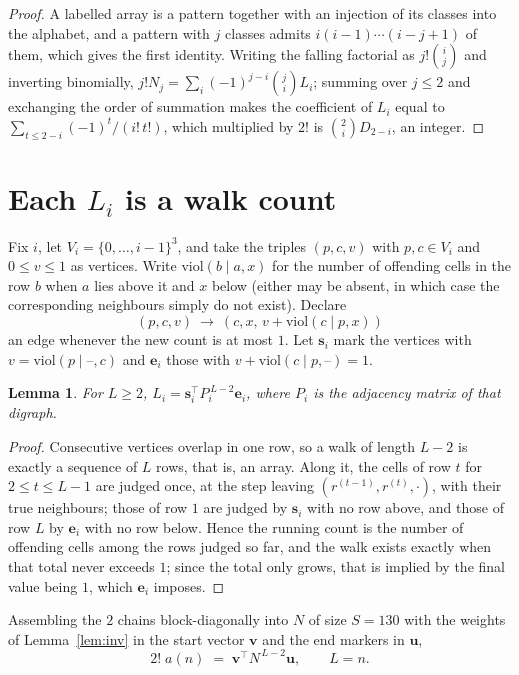 \documentclass[11pt,a4paper]{article}
\theoremstyle{plain}
\newtheorem{lemma}[theorem]{Lemma}
\theoremstyle{definition}
\begin{document}
\begin{proof}
A labelled array is a pattern together with an injection of its classes into the alphabet,
and a pattern with $j$ classes admits $i(i-1)\cdots(i-j+1)$ of them, which gives the first
identity. Writing the falling factorial as $j!\binom{i}{j}$ and inverting binomially,
$j!N_j=\sum_i(-1)^{j-i}\binom{j}{i}L_i$; summing over $j\le2$ and exchanging the
order of summation makes the coefficient of $L_i$ equal to
$\sum_{t\le2-i}(-1)^t/(i!\,t!)$, which multiplied by $2!$ is
$\binom{2}{i}D_{2-i}$, an integer.
\end{proof}

\section{Each $L_i$ is a walk count}

Fix $i$, let $V_i=\{0,\dots,i-1\}^{3}$, and take the triples $(p,c,v)$ with
$p,c\in V_i$ and $0\le v\le1$ as vertices. Write $\mathrm{viol}(b\mid a,x)$ for the number
of offending cells in the row $b$ when $a$ lies above it and $x$ below (either may be
absent, in which case the corresponding neighbours simply do not exist). Declare
\[
(p,c,v)\ \longrightarrow\ (c,x,\,v+\mathrm{viol}(c\mid p,x))
\]
an edge whenever the new count is at most $1$. Let $\mathbf{s}_i$ mark the vertices with
$v=\mathrm{viol}(p\mid\text{--},c)$ and $\mathbf{e}_i$ those with
$v+\mathrm{viol}(c\mid p,\text{--})=1$.

\begin{lemma}\label{lem:walk}
For $L\ge2$, $L_i=\mathbf{s}_i^{\!\top}P_i^{\,L-2}\mathbf{e}_i$, where $P_i$ is the
adjacency matrix of that digraph.
\end{lemma}

\begin{proof}
Consecutive vertices overlap in one row, so a walk of length $L-2$ is exactly a sequence
of $L$ rows, that is, an array. Along it, the cells of row $t$ for $2\le t\le L-1$ are
judged once, at the step leaving $(r^{(t-1)},r^{(t)},\cdot)$, with their true neighbours;
those of row $1$ are judged by $\mathbf{s}_i$ with no row above, and those of row
$L$ by $\mathbf{e}_i$ with no row below. Hence the running count is the number of
offending cells among the rows judged so far, and the walk exists exactly when that total
never exceeds $1$; since the total only grows, that is implied by the final value being
$1$, which $\mathbf{e}_i$ imposes.
\end{proof}

Assembling the $2$ chains block-diagonally into $N$ of size $S=130$ with the weights of
Lemma~\ref{lem:inv} in the start vector $\mathbf{v}$ and the end markers in
$\mathbf{u}$,
\begin{equation}\label{eq:walk2}
2!\;a(n)\;=\;\mathbf{v}^{\!\top}N^{\,L-2}\mathbf{u},\qquad L=n .
\end{equation}
\end{document}
